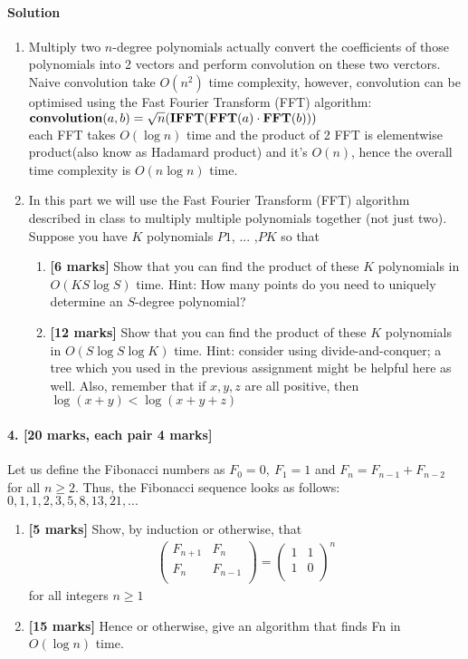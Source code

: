 \documentclass[a4paper]{scrartcl}
\newcommand{\CON}{\pPkey{convolution}}
\newcommand{\FFT}{\pPkey{FFT}}
\newcommand{\IFFT}{\pPkey{IFFT}}
\begin{document}
\paragraph{Solution}
\begin{enumerate}[label=(\alph*)]
\item Multiply two $n$-degree polynomials actually convert the coefficients of those polynomials into 2 vectors and perform convolution on these two verctors.\\ 
Naive convolution take $O(n^2)$ time complexity, however, 
convolution can be optimised using the Fast Fourier Transform (FFT) algorithm:\\
$ \CON(a,b) = \sqrt{n}(\IFFT(\FFT(a) \cdot \FFT(b)))$\\
each FFT takes $O(\log{n})$ time and the product of 2 FFT is elementwise product(also know as Hadamard product) and it's $O(n)$, hence the overall time complexity is $O(n\log{n})$ time.
\item In this part we will use the Fast Fourier Transform (FFT) algorithm described in class to multiply multiple polynomials together (not just two). Suppose you have $K$ polynomials $P1$, ... ,$PK$ so that
\begin{enumerate}[label=(\roman*)]
  \item {\bfseries[6 marks]} Show that you can find the product of these $K$ polynomials in $O(KS\log{S})$ time.
  Hint: How many points do you need to uniquely determine an $S$-degree polynomial?
  \item {\bfseries[12 marks]} Show that you can find the product of these $K$ polynomials in $O(S\log{S}\log{K})$ time.
  Hint: consider using divide-and-conquer; a tree which you used in the previous assignment might be helpful here as well. Also, remember that if $x,y,z$ are all positive, then $\log{(x + y)} < \log{(x + y + z)}$
\end{enumerate}
\end{enumerate}
\paragraph{4. [20 marks, each pair 4 marks]}
\label{sec:Question 4}
Let us define the Fibonacci numbers as $F_0=0,\ F_1=1$ and $F_n=F_{n-1}+F_{n-2}$ for all $n\geq2$. Thus, the Fibonacci sequence looks as follows: $0, 1, 1, 2, 3, 5, 8, 13, 21, . . .$
\begin{enumerate}[label=(\alph*)]
  \item{\bfseries[5 marks]} Show, by induction or otherwise, that
\begin{align*}
  \begin{pmatrix}
   F_{n+1} & F_n \\
   F_n & F_{n-1} \\
  \end{pmatrix}
  =
  \begin{pmatrix}
    1 & 1 \\
    1 & 0 \\
  \end{pmatrix}^{\!n}
\end{align*}
  for all integers $n\geq1$
  \item {\bfseries[15 marks]} Hence or otherwise, give an algorithm that finds Fn in $O(\log{n})$ time.
\end{enumerate}
\end{document}
